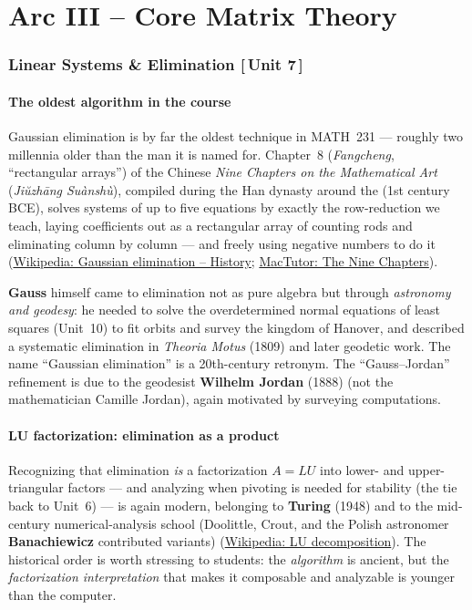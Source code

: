 \documentclass[11pt]{article}
\newcommand{\who}[1]{{\sffamily\bfseries #1}}
\newcommand{\yr}[1]{{\sffamily\color{BrickRed}(#1)}}
\newcommand{\unit}[1]{{\footnotesize\sffamily\color{RoyalBlue}[\,#1\,]}}
\begin{document}
\part*{Arc III -- Core Matrix Theory}

\section{Linear Systems \& Elimination \unit{Unit 7}}

\subsection{The oldest algorithm in the course}
Gaussian elimination is by far the oldest technique in MATH~231 --- roughly two
millennia older than the man it is named for. Chapter~8 (\emph{Fangcheng},
``rectangular arrays'') of the Chinese \emph{Nine Chapters on the Mathematical Art}
(\emph{Ji\u{u}zh\=ang Su\`ansh\`u}), compiled during the Han dynasty around the
\yr{1st century BCE}, solves systems of up to five equations by exactly the
row-reduction we teach, laying coefficients out as a rectangular array of counting
rods and eliminating column by column --- and freely using negative numbers to do
it (\href{https://en.wikipedia.org/wiki/Gaussian_elimination\#History}{Wikipedia:
Gaussian elimination -- History};
\href{https://mathshistory.st-andrews.ac.uk/HistTopics/Nine_chapters/}{MacTutor:
The Nine Chapters}).

\who{Gauss} himself came to elimination not as pure algebra but through
\emph{astronomy and geodesy}: he needed to solve the overdetermined normal
equations of least squares (Unit~10) to fit orbits and survey the kingdom of
Hanover, and described a systematic elimination in \emph{Theoria Motus} \yr{1809}
and later geodetic work. The name ``Gaussian elimination'' is a 20th-century
retronym. The ``Gauss--Jordan'' refinement is due to the geodesist \who{Wilhelm
Jordan} \yr{1888} (not the mathematician Camille Jordan), again motivated by
surveying computations.

\subsection{LU factorization: elimination as a product}
Recognizing that elimination \emph{is} a factorization $A=LU$ into lower- and
upper-triangular factors --- and analyzing when pivoting is needed for stability
(the tie back to Unit~6) --- is again modern, belonging to \who{Turing} \yr{1948}
and to the mid-century numerical-analysis school (Doolittle, Crout, and the Polish
astronomer \who{Banachiewicz} contributed variants)
(\href{https://en.wikipedia.org/wiki/LU_decomposition\#History}{Wikipedia: LU
decomposition}). The historical order is worth stressing to students: the
\emph{algorithm} is ancient, but the \emph{factorization interpretation} that makes
it composable and analyzable is younger than the computer.
\end{document}
